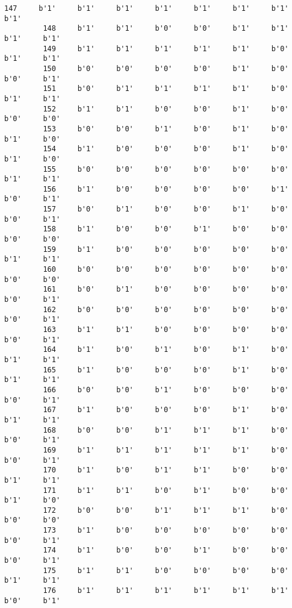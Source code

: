 \documentclass[11pt]{article}
\begin{document}
\begin{Verbatim}[commandchars=\\\{\}]
         147     b'1'     b'1'     b'1'     b'1'     b'1'     b'1'     b'1'     b'1'   
         148     b'1'     b'1'     b'0'     b'0'     b'1'     b'1'     b'1'     b'1'   
         149     b'1'     b'1'     b'1'     b'1'     b'1'     b'0'     b'1'     b'1'   
         150     b'0'     b'0'     b'0'     b'0'     b'1'     b'0'     b'0'     b'1'   
         151     b'0'     b'1'     b'1'     b'1'     b'1'     b'0'     b'1'     b'1'   
         152     b'1'     b'1'     b'0'     b'0'     b'1'     b'0'     b'0'     b'0'   
         153     b'0'     b'0'     b'1'     b'0'     b'1'     b'0'     b'1'     b'0'   
         154     b'1'     b'0'     b'0'     b'0'     b'1'     b'0'     b'1'     b'0'   
         155     b'0'     b'0'     b'0'     b'0'     b'0'     b'0'     b'1'     b'1'   
         156     b'1'     b'0'     b'0'     b'0'     b'0'     b'1'     b'0'     b'1'   
         157     b'0'     b'1'     b'0'     b'0'     b'1'     b'0'     b'0'     b'1'   
         158     b'1'     b'0'     b'0'     b'1'     b'0'     b'0'     b'0'     b'0'   
         159     b'1'     b'0'     b'0'     b'0'     b'0'     b'0'     b'1'     b'1'   
         160     b'0'     b'0'     b'0'     b'0'     b'0'     b'0'     b'0'     b'0'   
         161     b'0'     b'1'     b'0'     b'0'     b'0'     b'0'     b'0'     b'1'   
         162     b'0'     b'0'     b'0'     b'0'     b'0'     b'0'     b'0'     b'1'   
         163     b'1'     b'1'     b'0'     b'0'     b'0'     b'0'     b'0'     b'1'   
         164     b'1'     b'0'     b'1'     b'0'     b'1'     b'0'     b'1'     b'1'   
         165     b'1'     b'0'     b'0'     b'0'     b'1'     b'0'     b'1'     b'1'   
         166     b'0'     b'0'     b'1'     b'0'     b'0'     b'0'     b'0'     b'1'   
         167     b'1'     b'0'     b'0'     b'0'     b'1'     b'0'     b'1'     b'1'   
         168     b'0'     b'0'     b'1'     b'1'     b'1'     b'0'     b'0'     b'1'   
         169     b'1'     b'1'     b'1'     b'1'     b'1'     b'0'     b'0'     b'1'   
         170     b'1'     b'0'     b'1'     b'1'     b'0'     b'0'     b'1'     b'1'   
         171     b'1'     b'1'     b'0'     b'1'     b'0'     b'0'     b'1'     b'0'   
         172     b'0'     b'0'     b'1'     b'1'     b'1'     b'0'     b'0'     b'0'   
         173     b'1'     b'0'     b'0'     b'0'     b'0'     b'0'     b'0'     b'1'   
         174     b'1'     b'0'     b'0'     b'1'     b'0'     b'0'     b'0'     b'1'   
         175     b'1'     b'1'     b'0'     b'0'     b'0'     b'0'     b'1'     b'1'   
         176     b'1'     b'1'     b'1'     b'1'     b'1'     b'1'     b'0'     b'1'   

\end{Verbatim}
\end{document}
